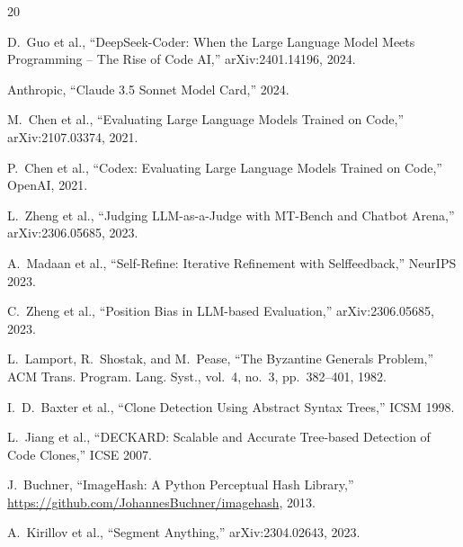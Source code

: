 \documentclass[11pt,a4paper]{article}
\begin{document}
\begin{thebibliography}{20}

D.~Guo et al., ``DeepSeek-Coder: When the Large Language Model Meets
Programming -- The Rise of Code AI,'' arXiv:2401.14196, 2024.

Anthropic, ``Claude 3.5 Sonnet Model Card,'' 2024.

M.~Chen et al., ``Evaluating Large Language Models Trained on Code,''
arXiv:2107.03374, 2021.

P.~Chen et al., ``Codex: Evaluating Large Language Models Trained on
Code,'' OpenAI, 2021.

L.~Zheng et al., ``Judging LLM-as-a-Judge with MT-Bench and
Chatbot Arena,'' arXiv:2306.05685, 2023.

A.~Madaan et al., ``Self-Refine: Iterative Refinement with Selffeedback,''
NeurIPS 2023.

C.~Zheng et al., ``Position Bias in LLM-based Evaluation,''
arXiv:2306.05685, 2023.

L.~Lamport, R.~Shostak, and M.~Pease, ``The Byzantine Generals Problem,''
ACM Trans. Program. Lang. Syst., vol.~4, no.~3, pp.~382--401, 1982.

I.~D.~Baxter et al., ``Clone Detection Using Abstract Syntax Trees,''
ICSM 1998.

L.~Jiang et al., ``DECKARD: Scalable and Accurate Tree-based
Detection of Code Clones,'' ICSE 2007.

J.~Buchner, ``ImageHash: A Python Perceptual Hash Library,''
\url{https://github.com/JohannesBuchner/imagehash}, 2013.

A.~Kirillov et al., ``Segment Anything,'' arXiv:2304.02643, 2023.

\end{thebibliography}
\end{document}
